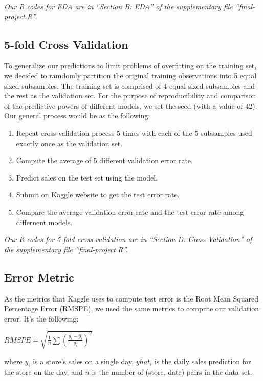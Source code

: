 \documentclass[letterpaper,twocolumn,11pt]{article}
\begin{document}
\begin{enumerate}
\end{enumerate}


\textit{Our R codes for EDA are in ``Section B: EDA'' of the supplementary file ``final-project.R''.}

\subsection{5-fold Cross Validation}
To generalize our predictions to limit problems of overfitting on the training set, we decided to ramdomly partition the original training observations into 5 equal sized subsamples. The training set is comprised of 4 equal sized subsamples and the rest as the validation set. For the purpose of reproducibility and comparison of the predictive powers of different models, we set the seed (with a value of 42). Our general process would be as the following:
\begin{enumerate}
\item  Repeat cross-validation process 5 times with each of the 5 subsamples used exactly once as the validation set.
\item Compute the average of 5 different validation error rate. 
\item Predict sales on the test set using the model. 
\item Submit on Kaggle website to get the test error rate.
\item Compare the average validation error rate and the test error rate among differnent models.
\end{enumerate}
  
\textit{Our R codes for 5-fold cross validation are in ``Section D: Cross Validation'' of the supplementary file ``final-project.R''.}

\subsection{Error Metric}
As the metrics that Kaggle uses to compute test error is the Root Mean Squared Percentage Error (RMSPE), we used the same metrics to compute our validation error. It's the following:

$RMSPE = \sqrt{\frac{1}{n} \sum {(\frac{y_i - \hat y_i}{y_i})}^2}$

where ${y_i}$ is a store's sales on a single day, ${yhat_i}$ is the daily sales prediction for the store on the day, and ${n}$ is the number of (store, date) pairs in the data set.
\end{document}
